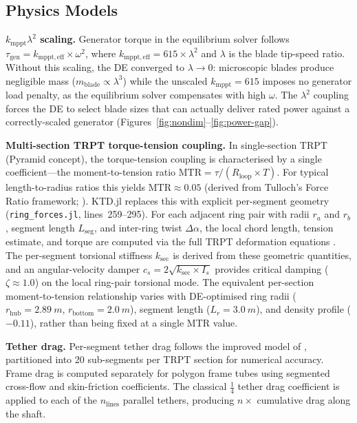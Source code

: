 \documentclass[11pt,a4paper]{article}
\begin{document}
\subsection{Physics Models}

\textbf{$k_{\mathrm{mppt}} \lambda^2$ scaling.} Generator torque in the equilibrium solver follows $\tau_{\mathrm{gen}} = k_{\mathrm{mppt,eff}} \times \omega^2$, where $k_{\mathrm{mppt,eff}} = 615 \times \lambda^2$ and $\lambda$ is the blade tip-speed ratio. Without this scaling, the DE converged to $\lambda \to 0$: microscopic blades produce negligible mass ($m_{\mathrm{blade}} \propto \lambda^3$) while the unscaled $k_{\mathrm{mppt}} = 615$ imposes no generator load penalty, as the equilibrium solver compensates with high $\omega$. The $\lambda^2$ coupling forces the DE to select blade sizes that can actually deliver rated power against a correctly-scaled generator (Figures~\ref{fig:nondim}--\ref{fig:power-gap}).

\textbf{Multi-section TRPT torque-tension coupling.} In single-section TRPT (Pyramid concept), the torque-tension coupling is characterised by a single coefficient—the moment-to-tension ratio $\mathrm{MTR} = \tau / (R_{\mathrm{loop}} \times T)$. For typical length-to-radius ratios this yields $\mathrm{MTR} \approx 0.05$ (derived from Tulloch's Force Ratio framework; \cite{tulloch2023}). KTD.jl replaces this with explicit per-segment geometry (\texttt{ring\_forces.jl}, lines~259--295). For each adjacent ring pair with radii $r_a$ and $r_b$, segment length $L_{\mathrm{seg}}$, and inter-ring twist $\Delta\alpha$, the local chord length, tension estimate, and torque are computed via the full TRPT deformation equations \cite{wacker2022} \cite{tulloch2023}. The per-segment torsional stiffness $k_{\mathrm{sec}}$ is derived from these geometric quantities, and an angular-velocity damper $c_s = 2\sqrt{k_{\mathrm{sec}} \times I_s}$ provides critical damping ($\zeta \approx 1.0$) on the local ring-pair torsional mode. The equivalent per-section moment-to-tension relationship varies with DE-optimised ring radii ($r_{\mathrm{hub}} = 2.89~m$, $r_{\mathrm{bottom}} = 2.0~m$), segment length ($L_r = 3.0~m$), and density profile ($-0.11$), rather than being fixed at a single MTR value.

\textbf{Tether drag.} Per-segment tether drag follows the improved model of \cite{tulloch2021,tulloch2023}, partitioned into 20 sub-segments per TRPT section for numerical accuracy. Frame drag is computed separately for polygon frame tubes using segmented cross-flow and skin-friction coefficients. The classical $\tfrac{1}{4}$ tether drag coefficient \cite{tveide} is applied to each of the $n_{\mathrm{lines}}$ parallel tethers, producing $n\times$ cumulative drag along the shaft.
\end{document}
